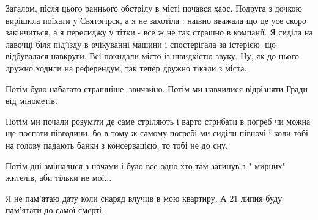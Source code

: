 Загалом, після цього раннього обстрілу в місті почався хаос. Подруга з дочкою
вирішила поїхати у Святогірск, а я не захотіла : наївно вважала що це усе скоро
закінчиться, а я пересиджу у тітки - все ж не так страшно в компанії. Я сиділа
на лавочці біля під'їзду в очікуванні машини і спостерігала за істерією, що
відбувалася навкруги. Всі покидали місто із швидкістю звуку.  Ну, як до цього
дружно ходили на референдум, так тепер дружно тікали з міста. 

Потім було набагато страшніше, звичайно. Потім ми навчилися відрізняти Гради
від мінометів.

Потім ми почали розуміти де саме стріляють і  варто стрибати в погреб чи можна
ще поспати півгодини, бо в тому ж самому погребі ми сиділи півночі і коли тобі
на голову падають банки з консервацією, то тобі не до сну.

Потім дні змішалися з ночами і було все одно  хто там загинув з " мирних"
жителів, аби тільки не мої...

Я не пам'ятаю дату коли снаряд влучив в мою квартиру. А 21 липня буду пам'ятати
до самої смерті.

